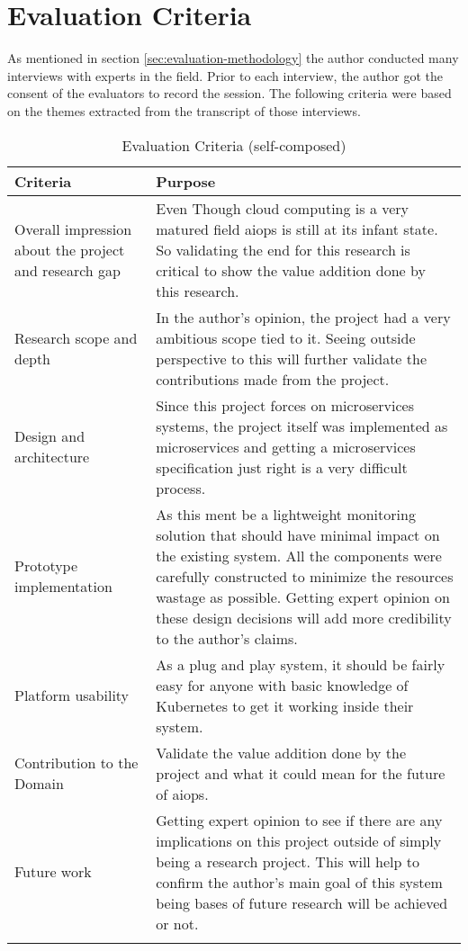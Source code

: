 \section{Evaluation Criteria}

As mentioned in section \ref{sec:evaluation-methodology} the author conducted many interviews with experts in the field. Prior to each interview, the author got the consent of the evaluators to record the session. The following criteria were based on the themes extracted from the transcript of those interviews.

\begin{longtable}{|p{33mm}|p{120mm}|}
    \hline
    \textbf{Criteria} &
    \textbf{Purpose} \\ \hline
    Overall impression about the project and research gap &
        Even Though cloud computing is a very matured field \ac{aiops} is still at its infant state. So validating the end for this research is critical to show the value addition done by this research. \\ \hline
    Research scope and depth &
        In the author's opinion, the project had a very ambitious scope tied to it. Seeing outside perspective to this will further validate the contributions made from the project. \\ \hline
    Design and architecture &
        Since this project forces on microservices systems, the project itself was implemented as microservices and getting a microservices specification just right is a very difficult process. \\ \hline
    Prototype implementation &
        As this ment be a lightweight monitoring solution that should have minimal impact on the existing system. All the components were carefully constructed to minimize the resources wastage as possible. Getting expert opinion on these design decisions will add more credibility to the author's claims. \\ \hline
    Platform usability &
        As a plug and play system, it should be fairly easy for anyone with basic knowledge of Kubernetes to get it working inside their system. \\ \hline
    Contribution to the Domain &
        Validate the value addition done by the project and what it could mean for the future of \ac{aiops}. \\ \hline
    Future work &
        Getting expert opinion to see if there are any implications on this project outside of simply being a research project. This will help to confirm the author’s main goal of this system being bases of future research will be achieved or not. \\ \hline
  
    \caption{Evaluation Criteria (self-composed)}
\end{longtable}